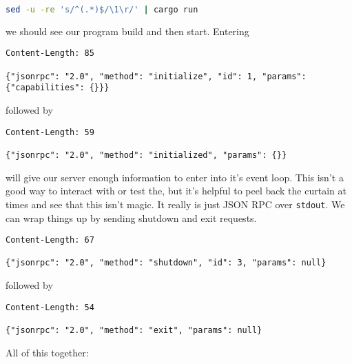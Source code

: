 \begin{lstlisting}[language=bash]
    sed -u -re 's/^(.*)$/\1\r/' | cargo run
\end{lstlisting}

we should see our program build and then start. Entering

\begin{lstlisting}
Content-Length: 85

{"jsonrpc": "2.0", "method": "initialize", "id": 1, "params": {"capabilities": {}}}
\end{lstlisting}

followed by

\begin{lstlisting}
Content-Length: 59

{"jsonrpc": "2.0", "method": "initialized", "params": {}}
\end{lstlisting}

will give our server enough information to enter into it's event loop. This isn't
a good way to interact with or test the, but it's helpful to peel back the curtain
at times and see that this isn't magic. It really is just JSON RPC over \texttt{stdout}.
We can wrap things up by sending shutdown and exit requests.

\begin{lstlisting}
Content-Length: 67

{"jsonrpc": "2.0", "method": "shutdown", "id": 3, "params": null}
\end{lstlisting}

followed by

\begin{lstlisting}
Content-Length: 54

{"jsonrpc": "2.0", "method": "exit", "params": null}
\end{lstlisting}

All of this together:

